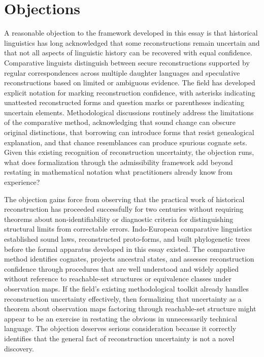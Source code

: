 \chapter{Objections}
\label{ch:essay-objections}

A reasonable objection to the framework developed in this essay is that historical linguistics has long acknowledged that some reconstructions remain uncertain and that not all aspects of linguistic history can be recovered with equal confidence. Comparative linguists distinguish between secure reconstructions supported by regular correspondences across multiple daughter languages and speculative reconstructions based on limited or ambiguous evidence. The field has developed explicit notation for marking reconstruction confidence, with asterisks indicating unattested reconstructed forms and question marks or parentheses indicating uncertain elements. Methodological discussions routinely address the limitations of the comparative method, acknowledging that sound change can obscure original distinctions, that borrowing can introduce forms that resist genealogical explanation, and that chance resemblances can produce spurious cognate sets. Given this existing recognition of reconstruction uncertainty, the objection runs, what does formalization through the admissibility framework add beyond restating in mathematical notation what practitioners already know from experience?

The objection gains force from observing that the practical work of historical reconstruction has proceeded successfully for two centuries without requiring theorems about non-identifiability or diagnostic criteria for distinguishing structural limits from correctable errors. Indo-European comparative linguistics established sound laws, reconstructed proto-forms, and built phylogenetic trees before the formal apparatus developed in this essay existed. The comparative method identifies cognates, projects ancestral states, and assesses reconstruction confidence through procedures that are well understood and widely applied without reference to reachable-set structures or equivalence classes under observation maps. If the field's existing methodological toolkit already handles reconstruction uncertainty effectively, then formalizing that uncertainty as a theorem about observation maps factoring through reachable-set structure might appear to be an exercise in restating the obvious in unnecessarily technical language. The objection deserves serious consideration because it correctly identifies that the general fact of reconstruction uncertainty is not a novel discovery.

